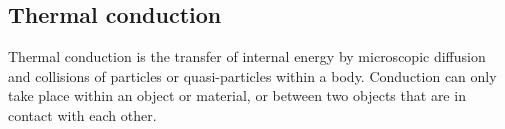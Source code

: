 \subsection{Thermal conduction}
\noindent
Thermal conduction is the transfer of internal energy by microscopic diffusion and collisions of particles or quasi-particles within a body.
Conduction can only take place within an object or material, or between two objects that are in contact with each other.


